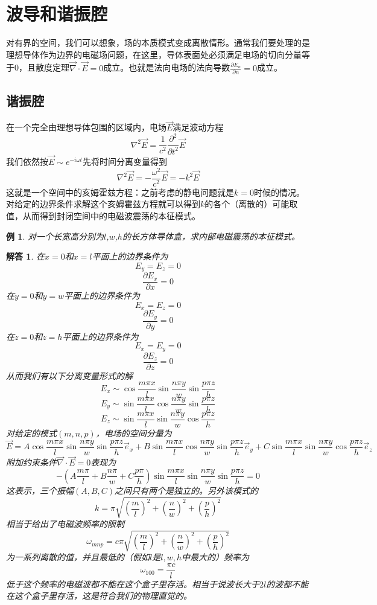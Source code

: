 \documentclass[a4paper,11pt]{ctexbook}
\newtheorem{eg}{例}[section]
\newtheorem{ans}{解答}[section]
\newcommand{\beq}{\begin{equation}}
\newcommand{\eeq}{\end{equation}}
\newcommand{\del}{\vec{\nabla}}
\newcommand{\pfrac}[2]{\frac{\partial #1}{\partial #2}}
\begin{document}
\section{波导和谐振腔}
对有界的空间，我们可以想象，场的本质模式变成离散情形。通常我们要处理的是理想导体作为边界的电磁场问题，在这里，导体表面处必须满足电场的切向分量等于0，且散度定理$\del \cdot \vec E=0$成立。也就是法向电场的法向导数$\pfrac{E_n}{n}=0$成立。
\subsection{谐振腔}
在一个完全由理想导体包围的区域内，电场$\vec E$满足波动方程
\beq
\nabla^2 \vec E = \frac{1}{c^2} \pfrac{^2}{ t^2} \vec E
\eeq
我们依然按$\vec E \sim e^{-i\omega t}$先将时间分离变量得到
\beq
\nabla^2 \vec E = - \frac{\omega^2}{c^2} \vec E = -k^2 \vec E
\eeq
这就是一个空间中的亥姆霍兹方程：之前考虑的静电问题就是$k=0$时候的情况。对给定的边界条件求解这个亥姆霍兹方程就可以得到$k$的各个（离散的）可能取值，从而得到封闭空间中的电磁波震荡的本征模式。
\begin{eg}
对一个长宽高分别为$l$,$w$,$h$的长方体导体盒，求内部电磁震荡的本征模式。
\end{eg}
\begin{ans}
在$x=0$和$x=l$平面上的边界条件为
\beq
E_y = E_z = 0
\eeq
\beq
\pfrac{E_x}{x} = 0
\eeq
在$y=0$和$y=w$平面上的边界条件为
\beq
E_x = E_z = 0
\eeq
\beq
\pfrac{E_y}{y} = 0
\eeq
在$z=0$和$z=h$平面上的边界条件为
\beq
E_x = E_y = 0
\eeq
\beq
\pfrac{E_z}{z} = 0
\eeq
从而我们有以下分离变量形式的解
\beq
E_x \sim \cos \frac{m\pi x}{l} \sin \frac{n\pi y}{w} \sin \frac{p\pi z}{h}
\eeq
\beq
E_y \sim \sin \frac{m \pi x}{l} \cos \frac{n \pi y}{w} \sin \frac{p \pi z}{h}
\eeq
\beq
E_z \sim \sin \frac{m \pi x}{l} \sin \frac{n\pi y}{w} \cos \frac{p \pi z}{h}
\eeq
对给定的模式$(m,n,p)$，电场的空间分量为
\beq
\vec E = A \cos \frac{m\pi x}{l} \sin \frac{n\pi y}{w} \sin \frac{p\pi z}{h} \vec{e}_x + B \sin \frac{m \pi x}{l} \cos \frac{n \pi y}{w} \sin \frac{p \pi z}{h} \vec{e}_y + C  \sin \frac{m \pi x}{l} \sin \frac{n\pi y}{w} \cos \frac{p \pi z}{h}\vec{e}_z
\eeq
附加约束条件$\del \cdot \vec E=0$表现为
\beq
-\left(A \frac{m\pi}{l} + B \frac{n\pi}{w} + C \frac{p\pi}{h}\right)\sin \frac{m\pi x}{l} \sin \frac{n\pi y}{w} \sin \frac{p\pi z}{h}=0
\eeq
这表示，三个振幅$(A,B,C)$之间只有两个是独立的。另外该模式的
\beq
k= \pi \sqrt{\left(\frac{m}{l}\right)^2+\left(\frac{n}{w}\right)^2 + \left(\frac{p}{h}\right)^2}
\eeq
相当于给出了电磁波频率的限制
\beq
\omega_{mnp} = c\pi\sqrt{\left(\frac{m}{l}\right)^2+\left(\frac{n}{w}\right)^2 + \left(\frac{p}{h}\right)^2}
\eeq
为一系列离散的值，并且最低的（假如$l$是$l,w,h$中最大的）频率为
\beq
\omega_{100} = \frac{\pi c}{l}
\eeq
低于这个频率的电磁波都不能在这个盒子里存活。相当于说波长大于$2l$的波都不能在这个盒子里存活，这是符合我们的物理直觉的。

\end{ans}
\end{document}
